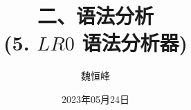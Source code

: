 \documentclass[]{beamer}
\title[语法分析]{二、语法分析 \\ (5. $LR0$ 语法分析器)}
\author[魏恒峰]{\large 魏恒峰}
\institute{hfwei@nju.edu.cn}
\date{2023年05月24日}
\begin{document}
\maketitle



\thankyou{}

\end{document}
